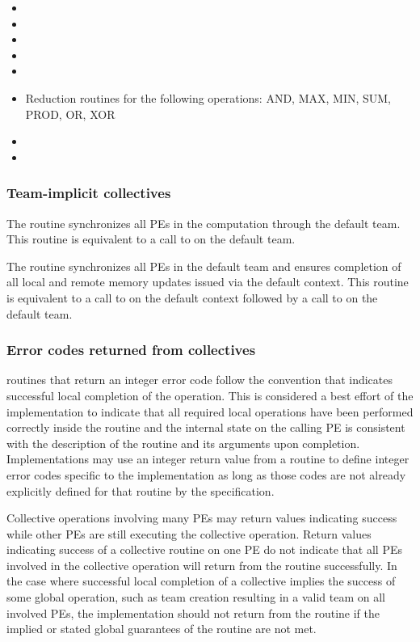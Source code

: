 \begin{DeprecateBlock}
\begin{itemize}
\item {}
\item {}
\item {}
\item {}
\item {}
\item Reduction routines for the following operations: AND, MAX, MIN, SUM, PROD, OR, XOR
\item {}
\item {}
\end{itemize}

\end{DeprecateBlock}


\subsubsection*{Team-implicit collectives}

The  routine synchronizes all \acp{PE} in the
computation through the default team. This routine is equivalent to a
call to  on the default team.

The  routine synchronizes all \acp{PE} in
the default team and ensures completion of all local and remote memory
updates issued via the default context.  This routine is equivalent to
a call to  on the default context followed by a
call to  on the default team.

\subsubsection*{Error codes returned from collectives}
\CorCpp routines that return an integer error code follow the convention that  indicates successful local completion of the operation. This is considered a best effort of the implementation to indicate that all required local operations have been performed correctly inside the routine and the internal \openshmem state on the calling \ac{PE} is consistent with the description of the routine and its arguments upon completion. Implementations may use an integer return value from a routine to define integer error codes specific to the implementation as long as those codes are not already explicitly defined for that routine by the \openshmem specification.

Collective operations involving many \acp{PE} may return values indicating success while other \acp{PE} are still executing the collective operation. Return values indicating success of a collective routine on one \ac{PE} do not indicate that all \acp{PE} involved in the collective operation will return from the routine successfully. In the case where successful local completion of a collective implies the success of some global operation, such as team creation resulting in a valid team on all involved \acp{PE}, the implementation should not return  from the routine if the implied or stated global guarantees of the routine are not met.
